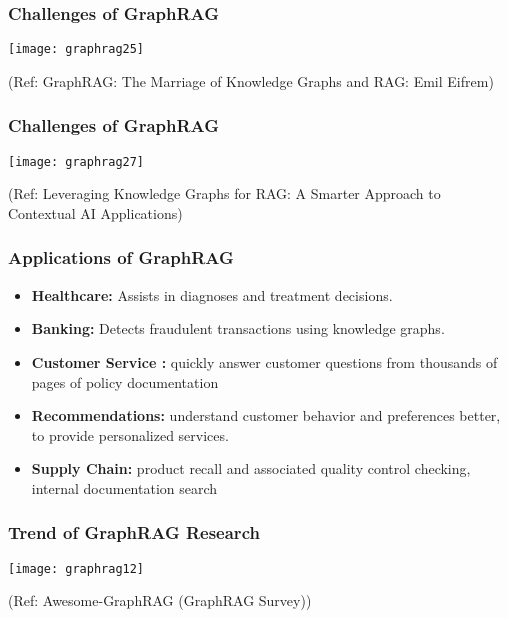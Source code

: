 \begin{frame}[fragile]\frametitle{Challenges of GraphRAG}

	\begin{center}
	\texttt{[image: graphrag25]}
	\end{center}
	
	{\tiny (Ref: GraphRAG: The Marriage of Knowledge Graphs and RAG: Emil Eifrem)}

	
\end{frame}

\begin{frame}[fragile]\frametitle{Challenges of GraphRAG}

	\begin{center}
	\texttt{[image: graphrag27]}
	\end{center}
	
	{\tiny (Ref: Leveraging Knowledge Graphs for RAG: A Smarter Approach to Contextual AI Applications)}

	
\end{frame}


\begin{frame}[fragile]\frametitle{Applications of GraphRAG}
    \begin{itemize}
        \item \textbf{Healthcare:} Assists in diagnoses and treatment decisions.
        \item \textbf{Banking:} Detects fraudulent transactions using knowledge graphs.
        \item \textbf{Customer Service :} quickly answer customer questions from thousands of pages of policy documentation
        \item \textbf{Recommendations:} understand customer behavior and preferences better, to provide personalized services.
        \item \textbf{Supply Chain:} product recall and associated quality control checking, internal documentation search
	
    \end{itemize}

\end{frame}


\begin{frame}[fragile]\frametitle{Trend of GraphRAG Research}

	\begin{center}
	\texttt{[image: graphrag12]}
	\end{center}
	
		{\tiny (Ref: Awesome-GraphRAG (GraphRAG Survey))}

	
\end{frame}

